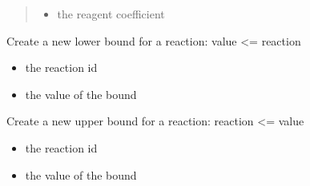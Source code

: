 \documentclass[letterpaper,12pt,english]{sphinxmanual}
\begin{document}
\begin{fulllineitems}
\begin{fulllineitems}
\begin{quote}
\begin{description}
\begin{itemize}
\item {} 
\sphinxAtStartPar
{} \textendash{} the reagent coefficient

\end{itemize}

\end{description}\end{quote}

\end{fulllineitems}


\begin{fulllineitems}
\label{\detokenize{api/core:cbmpy.CBModel.Model.createReactionLowerBound}}
\pysigstartsignatures
\pysiglinewithargsret
{}
{\sphinxparamcomma {}}
{}
\pysigstopsignatures
\sphinxAtStartPar
Create a new lower bound for a reaction: value \textless{}= reaction
\begin{itemize}
\item {} 
\sphinxAtStartPar
{} the reaction id

\item {} 
\sphinxAtStartPar
{} the value of the bound

\end{itemize}

\end{fulllineitems}


\begin{fulllineitems}
\label{\detokenize{api/core:cbmpy.CBModel.Model.createReactionUpperBound}}
\pysigstartsignatures
\pysiglinewithargsret
{}
{\sphinxparamcomma {}}
{}
\pysigstopsignatures
\sphinxAtStartPar
Create a new upper bound for a reaction: reaction \textless{}= value
\begin{itemize}
\item {} 
\sphinxAtStartPar
{} the reaction id

\item {} 
\sphinxAtStartPar
{} the value of the bound


\end{itemize}
\end{fulllineitems}
\end{fulllineitems}
\end{document}
